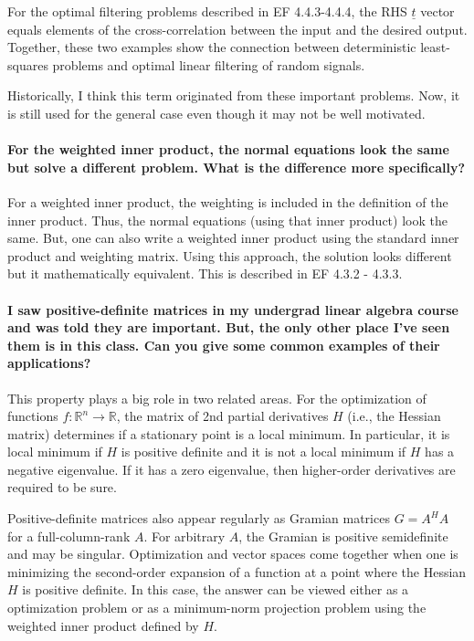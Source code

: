 \documentclass[10pt,english]{article}
\begin{document}
For the optimal filtering problems described in EF 4.4.3-4.4.4, the RHS $\underline{t}$ vector equals elements of the cross-correlation between the input and the desired output.
Together, these two examples show the connection between deterministic least-squares problems and optimal linear filtering of random signals.

Historically, I think this term originated from these important problems.
Now, it is still used for the general case even though it may not be well motivated.


\paragraph{For the weighted inner product, the normal equations look the same but solve a different problem. What is the difference more specifically?}
For a weighted inner product, the weighting is included in the definition of the inner product.
Thus, the normal equations (using that inner product) look the same.
But, one can also write a weighted inner product using the standard inner product and weighting matrix.
Using this approach, the solution looks different but it mathematically equivalent.
This is described in EF 4.3.2 - 4.3.3.


\paragraph{I saw positive-definite matrices in my undergrad linear algebra course and was told they are important. But, the only other place I've seen them is in this class. Can you give some common examples of their applications?}

This property plays a big role in two related areas.
For the optimization of functions $f \colon \mathbb{R}^n \to \mathbb{R}$, the matrix of 2nd partial derivatives $H$ (i.e., the Hessian matrix) determines if a stationary point is a local minimum.
In particular, it is local minimum if $H$ is positive definite and it is not a local minimum if $H$ has a negative eigenvalue.
If it has a zero eigenvalue, then higher-order derivatives are required to be sure.

Positive-definite matrices also appear regularly as Gramian matrices $G = A^H A$ for a full-column-rank $A$. For arbitrary $A$, the Gramian is positive semidefinite and may be singular.
Optimization and vector spaces come together when one is minimizing the second-order expansion of a function at a point where the Hessian $H$ is positive definite.
In this case, the answer can be viewed either as a optimization problem or as a minimum-norm projection problem using the weighted inner product defined by $H$.
\end{document}
